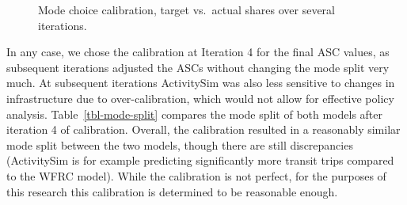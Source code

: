 \documentclass[fancy, oneside, mastersfancy, ms]{byuthesis}
\begin{document}
\begin{figure}


\caption{\label{fig-mcc-adjustments}Mode choice calibration, target
vs.~actual shares over several iterations.}

\end{figure}%

In any case, we chose the calibration at Iteration 4 for the final ASC
values, as subsequent iterations adjusted the ASCs without changing the
mode split very much. At subsequent iterations ActivitySim was also less
sensitive to changes in infrastructure due to over-calibration, which
would not allow for effective policy analysis.
Table~\ref{tbl-mode-split} compares the mode split of both models after
iteration 4 of calibration. Overall, the calibration resulted in a
reasonably similar mode split between the two models, though there are
still discrepancies (ActivitySim is for example predicting significantly
more transit trips compared to the WFRC model). While the calibration is
not perfect, for the purposes of this research this calibration is
determined to be reasonable enough.
\end{document}
